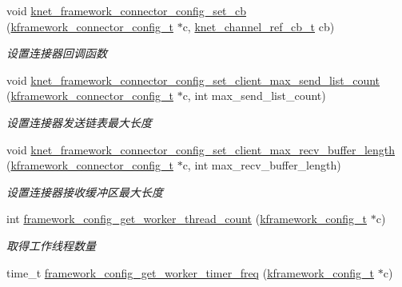 \begin{DoxyCompactItemize}
void \hyperlink{a00115_ga03024112cca453db282a4aa4af7bedc8_ga03024112cca453db282a4aa4af7bedc8}{knet\+\_\+framework\+\_\+connector\+\_\+config\+\_\+set\+\_\+cb} (\hyperlink{a00056_a44d3033eba5a4fd784a741700a7a2521_a44d3033eba5a4fd784a741700a7a2521}{kframework\+\_\+connector\+\_\+config\+\_\+t} $\ast$c, \hyperlink{a00056_a8a7d96123ef4565c6d08fe58a10476a9_a8a7d96123ef4565c6d08fe58a10476a9}{knet\+\_\+channel\+\_\+ref\+\_\+cb\+\_\+t} cb)
\begin{DoxyCompactList}\small\item\em 设置连接器回调函数 \end{DoxyCompactList}\item 
void \hyperlink{a00115_ga32b058fe0a17d4a609097157761bb9f1_ga32b058fe0a17d4a609097157761bb9f1}{knet\+\_\+framework\+\_\+connector\+\_\+config\+\_\+set\+\_\+client\+\_\+max\+\_\+send\+\_\+list\+\_\+count} (\hyperlink{a00056_a44d3033eba5a4fd784a741700a7a2521_a44d3033eba5a4fd784a741700a7a2521}{kframework\+\_\+connector\+\_\+config\+\_\+t} $\ast$c, int max\+\_\+send\+\_\+list\+\_\+count)
\begin{DoxyCompactList}\small\item\em 设置连接器发送链表最大长度 \end{DoxyCompactList}\item 
void \hyperlink{a00115_ga671b44cb682198b418b21749e6b2fdbe_ga671b44cb682198b418b21749e6b2fdbe}{knet\+\_\+framework\+\_\+connector\+\_\+config\+\_\+set\+\_\+client\+\_\+max\+\_\+recv\+\_\+buffer\+\_\+length} (\hyperlink{a00056_a44d3033eba5a4fd784a741700a7a2521_a44d3033eba5a4fd784a741700a7a2521}{kframework\+\_\+connector\+\_\+config\+\_\+t} $\ast$c, int max\+\_\+recv\+\_\+buffer\+\_\+length)
\begin{DoxyCompactList}\small\item\em 设置连接器接收缓冲区最大长度 \end{DoxyCompactList}\item 
int \hyperlink{a00060_aafb4c7a8913ed48592037da43edd8e39_aafb4c7a8913ed48592037da43edd8e39}{framework\+\_\+config\+\_\+get\+\_\+worker\+\_\+thread\+\_\+count} (\hyperlink{a00056_adeaf952e0f0887507ff836385bf54874_adeaf952e0f0887507ff836385bf54874}{kframework\+\_\+config\+\_\+t} $\ast$c)
\begin{DoxyCompactList}\small\item\em 取得工作线程数量 \end{DoxyCompactList}\item 
time\+\_\+t \hyperlink{a00060_ab0815a3aff5ee221ba2870899e25f045_ab0815a3aff5ee221ba2870899e25f045}{framework\+\_\+config\+\_\+get\+\_\+worker\+\_\+timer\+\_\+freq} (\hyperlink{a00056_adeaf952e0f0887507ff836385bf54874_adeaf952e0f0887507ff836385bf54874}{kframework\+\_\+config\+\_\+t} $\ast$c)

\end{DoxyCompactItemize}
